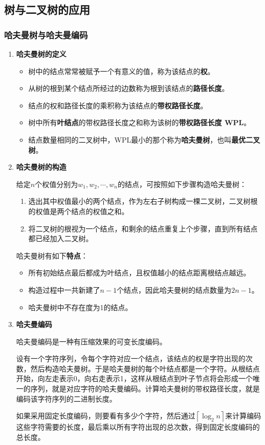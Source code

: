 \documentclass[12pt, a4paper, oneside]{ctexart}
\begin{document}
\subsection{树与二叉树的应用}

\subsubsection{哈夫曼树与哈夫曼编码}

\begin{enumerate}
  \item {\bf 哈夫曼树的定义}

  \begin{itemize}
    \item 树中的结点常常被赋予一个有意义的值，称为该结点的\textbf{权}。
    \item 从树的根到某个结点所经过的边数称为根到该结点的\textbf{路径长度}。
    \item 结点的权和路径长度的乘积称为该结点的\textbf{带权路径长度}。
    \item 树中所有\textbf{叶结点}的带权路径长度之和称为该树的\textbf{带权路径长度 WPL}。
    \item 结点数量相同的二叉树中，WPL最小的那个称为\textbf{哈夫曼树}，也叫\textbf{最优二叉树}。
  \end{itemize}

  \item {\bf 哈夫曼树的构造}
  
  给定$n$个权值分别为$w_1,w_2,\cdots,w_n$的结点，可按照如下步骤构造哈夫曼树：
  \begin{enumerate}
    \item 选出其中权值最小的两个结点，作为左右子树构成一棵二叉树，二叉树根的权值是两个结点的权值之和。
    \item 将二叉树的根视为一个结点，和剩余的结点重复上个步骤，直到所有结点都已经加入二叉树。
  \end{enumerate}

  哈夫曼树有如下\textbf{特点}：
  \begin{itemize}
    \item 所有初始结点最后都成为叶结点，且权值越小的结点距离根结点越远。
    \item 构造过程中一共新建了$n-1$个结点，因此哈夫曼树的结点数量为$2n-1$。
    \item 哈夫曼树中不存在度为1的结点。
  \end{itemize}

  \item {\bf 哈夫曼编码}
  
  哈夫曼编码是一种有压缩效果的可变长度编码。

  设有一个字符序列，令每个字符对应一个结点，该结点的权是字符出现的次数，然后构造哈夫曼树。于是哈夫曼树的每个叶结点都是一个字符。从根结点开始，向左走表示0，向右走表示1，这样从根结点到叶子节点将会形成一个唯一的序列，就是对应字符的哈夫曼编码。计算哈夫曼树的带权路径长度，就是编码该字符序列的二进制长度。

  如果采用固定长度编码，则要看有多少个字符，然后通过$\left\lceil \log_2 n\right\rceil$来计算编码这些字符需要的长度，最后乘以所有字符出现的总次数，得到固定长度编码的总长度。
\end{enumerate}
\end{document}
